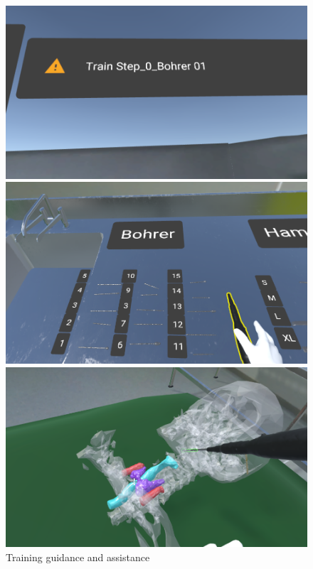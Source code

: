 \begin{figure}
    \centering
    \begin{minipage}{.5\textwidth}
      \centering
      \includegraphics[width=0.95\linewidth]{images/implementation/features/training/train_guide.png}
    \end{minipage}%
    \begin{minipage}{.5\textwidth}
      \centering
      \includegraphics[width=0.915\linewidth]{images/implementation/features/training/train_select.png}
    \end{minipage}
    \begin{minipage}{1\textwidth}
        \centering
        \includegraphics[width=0.95\linewidth]{images/implementation/features/training/training.png}
      \end{minipage}%
    \caption{\label{fig::TrainingMode}Training guidance and assistance}
  \end{figure}

